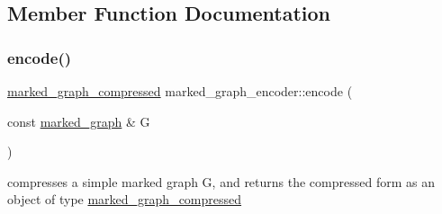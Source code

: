 \subsection{Member Function Documentation}
\mbox{\label{classmarked__graph__encoder_aa7fa19a225dd9b31d6fef9583fab8cf1}} 
\subsubsection{\texorpdfstring{encode()}{encode()}\hspace{0.1cm}{\footnotesize\ttfamily [1/2]}}
{\footnotesize\ttfamily \hyperlink{classmarked__graph__compressed}{marked\+\_\+graph\+\_\+compressed} marked\+\_\+graph\+\_\+encoder\+::encode (\begin{DoxyParamCaption}\item[{const \hyperlink{classmarked__graph}{marked\+\_\+graph} \&}]{G }\end{DoxyParamCaption})}



compresses a simple marked graph G, and returns the compressed form as an object of type {\ttfamily \hyperlink{classmarked__graph__compressed}{marked\+\_\+graph\+\_\+compressed}} 


